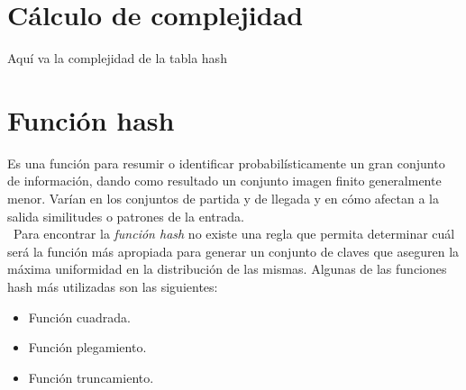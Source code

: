\documentclass[letterpaper,openright,12pt]{report}
\begin{document}
\section{Cálculo de complejidad}
Aquí va la complejidad de la tabla hash
\newpage

\section{Función hash}

Es una función para resumir o identificar probabilísticamente un gran
conjunto de información, dando como resultado un conjunto imagen finito
generalmente menor. Varían en los conjuntos de partida y de llegada y en
cómo afectan a la salida similitudes o patrones de la entrada.\\\
{Para encontrar la \emph{función hash} no existe una regla que permita
determinar cuál será la función más apropiada para generar un conjunto
de claves que aseguren la máxima uniformidad en la distribución de las
mismas. Algunas de las funciones hash más utilizadas son las
siguientes:}
\begin{itemize}
\itemsep1pt\parskip0pt
\item
  Función cuadrada.
\item
  Función plegamiento.
\item
  Función truncamiento.
\end{itemize}
\end{document}
